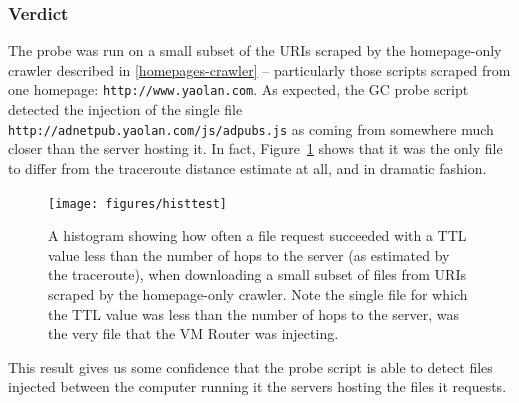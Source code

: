 \subsubsection{Verdict}
The probe was run on a small subset of the URIs scraped by the homepage-only crawler described in \autoref{homepages-crawler} -- particularly those scripts scraped from one homepage: \texttt{http://www.yaolan.com}.
As expected, the GC probe script detected the injection of the single file \texttt{http://adnetpub.yaolan.com/js/adpubs.js} as coming from somewhere much closer than the server hosting it.
In fact, Figure~\ref{fig_histtest} shows that it was the only file to differ from the traceroute distance estimate at all, and in dramatic fashion.
\begin{figure}
	\texttt{[image: figures/histtest]}
	\caption{
		A histogram showing how often a file request succeeded with a TTL value less than the number of hops to the server (as estimated by the traceroute), when downloading a small subset of files from URIs scraped by the homepage-only crawler.
		Note the single file for which the TTL value was less than the number of hops to the server, was the very file that the VM Router was injecting.
	}
	\label{fig_histtest}
\end{figure}
This result gives us some confidence that the probe script is able to detect files injected between the computer running it the servers hosting the files it requests.